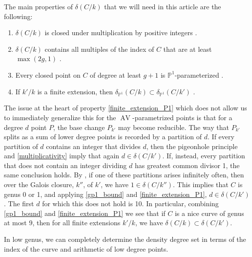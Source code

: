 \documentclass[a4paper,11pt]{amsart}
\theoremstyle{plain}
\theoremstyle{remark}
\newcommand{\dendegs}{\delta}
\newcommand{\AV}{\operatorname{AV}}
\begin{document}
The main properties of  $\dendegs(C/k)$ that we will need in this article are the following:

\begin{enumerate}
    \item\label{multiplicativity} \(\dendegs(C/k)\) is closed under multiplication by positive integers \cite[Section 5.2.1]{VV}.
    \item\label{2g_bound} \(\dendegs(C/k)\) contains all multiples of the index of \(C\) that are at least \(\max(2g, 1)\) \cite[Proposition 5.1.1]{VV}.
    \item\label{gp1_bound} Every closed point on \(C\) of degree at least \(g+1\) is \(\mathbb{P}^1\)-parameterized \cite[Corollary 4.1.2]{VV}.
    \item\label{finite_extension_P1} If \(k'/k\) is a finite extension, then \(\dendegs_{\mathbb{P}^1}(C/k) \subset \dendegs_{\mathbb{P}^1}(C/k')\) \cite[Lemma 5.5.2]{VV}.
\end{enumerate}


The issue at the heart of property \eqref{finite_extension_P1} which does not allow us to immediately generalize this for the \(\AV\)-parametrized points is that for a degree \(d\) point \(P\), the base change \(P_{k'}\) may become reducible.  The way that \(P_{k'}\) splits as a sum of lower degree points is recorded by a partition of \(d\).  If every partition of \(d\) contains an integer that divides \(d\), then the pigeonhole principle and \eqref{multiplicativity} imply that again \(d \in \dendegs(C/k')\). 
If, instead, every partition that does not contain an integer dividing $d$ has greatest common divisor 1, the same conclusion holds. By \cite[Proposition 2.2.1]{VV}, if one of these partitions arises infinitely often, then over the Galois closure, $k''$, of $k'$, we have $1 \in \dendegs(C / k'')$. This implies that $C$ is genus 0 or 1, and applying \eqref{gp1_bound} and \eqref{finite_extension_P1}, $d \in \dendegs(C / k')$. The first $d$ for which this does not hold is 10.
In particular, combining \eqref{gp1_bound} and \eqref{finite_extension_P1} we see that if \(C\) is a nice curve of genus at most \(9\), then for all finite extensions \(k'/k\), we have \(\dendegs(C/k) \subset \dendegs(C/k')\).

In low genus, we can completely determine the density degree set in terms of the index of the curve and arithmetic of low degree points.
\end{document}
